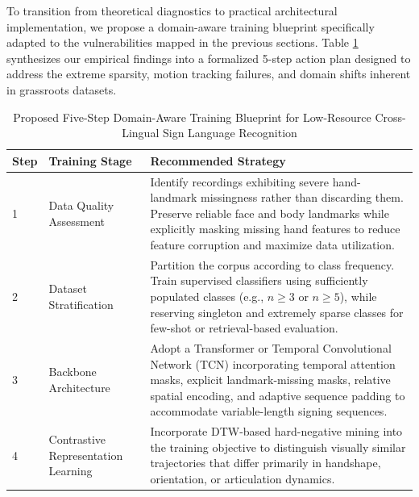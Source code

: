 \documentclass{ieeeaccess}
\DeclareRobustCommand{\textbf}[1]{{\bfseries #1}}
\begin{document}
To transition from theoretical diagnostics to practical architectural implementation, we propose a domain-aware training blueprint specifically adapted to the vulnerabilities mapped in the previous sections. Table \ref{tab:action_plan} synthesizes our empirical findings into a formalized 5-step action plan designed to address the extreme sparsity, motion tracking failures, and domain shifts inherent in grassroots datasets.

\begin{table}[!t]
\caption{Proposed Five-Step Domain-Aware Training Blueprint for Low-Resource Cross-Lingual Sign Language Recognition}
\label{tab:action_plan}

\centering
\small
\setlength{\tabcolsep}{5pt}

\begin{tabular}{p{0.7cm}p{3.2cm}p{11.8cm}}

\toprule

\textbf{Step} &
\textbf{Training Stage} &
\textbf{Recommended Strategy} \\

\midrule

1 &
Data Quality Assessment &
Identify recordings exhibiting severe hand-landmark missingness rather than discarding them. Preserve reliable face and body landmarks while explicitly masking missing hand features to reduce feature corruption and maximize data utilization. \\

\addlinespace

2 &
Dataset Stratification &
Partition the corpus according to class frequency. Train supervised classifiers using sufficiently populated classes (e.g., $n\ge3$ or $n\ge5$), while reserving singleton and extremely sparse classes for few-shot or retrieval-based evaluation. \\

\addlinespace

3 &
Backbone Architecture &
Adopt a Transformer or Temporal Convolutional Network (TCN) incorporating temporal attention masks, explicit landmark-missing masks, relative spatial encoding, and adaptive sequence padding to accommodate variable-length signing sequences. \\

\addlinespace

4 &
Contrastive Representation Learning &
Incorporate DTW-based hard-negative mining into the training objective to distinguish visually similar trajectories that differ primarily in handshape, orientation, or articulation dynamics. \\


\end{tabular}
\end{table}
\end{document}
